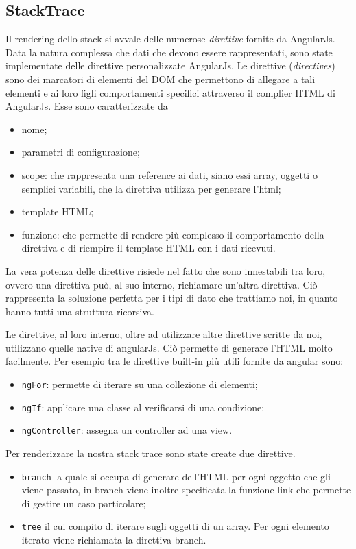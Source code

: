 \subsection{StackTrace} 
Il rendering dello stack si avvale delle numerose \emph{direttive} fornite da 
AngularJs. \\Data la natura complessa che dati che devono essere rappresentati, sono state 
implementate delle direttive personalizzate AngularJs. 
Le direttive (\emph{directives}) sono dei marcatori di elementi del DOM che permettono di allegare 
a tali elementi e ai loro figli comportamenti specifici attraverso il complier 
HTML di AngularJs. Esse sono  caratterizzate da 
\begin{itemize} 
	\item nome;
	\item parametri di configurazione;
	\item scope:  che rappresenta una reference ai dati, siano essi array, oggetti o 
	semplici variabili, che la direttiva utilizza per generare l'html;
	\item template HTML;
	\item funzione: che permette di rendere più complesso il comportamento della direttiva
	e di riempire il template HTML con i dati ricevuti.
\end{itemize} 

La vera potenza delle direttive risiede nel fatto che sono innestabili tra loro, 
ovvero una direttiva può, al suo interno, richiamare un'altra direttiva. Ciò 
rappresenta la soluzione perfetta per i tipi di dato che trattiamo noi, in quanto 
hanno tutti una struttura ricorsiva. 

Le direttive, al loro interno, oltre ad utilizzare altre direttive scritte da noi, 
utilizzano quelle native di angularJs. Ciò permette di generare l'HTML molto 
facilmente. Per esempio tra le direttive built-in più utili fornite da angular sono: 
\begin{itemize} 
	\item \texttt{ngFor}: permette di iterare su una collezione di elementi;
	\item \texttt{ngIf}: applicare una classe  al verificarsi di una condizione; 
	\item \texttt{ngController}: assegna un controller ad una view.
\end{itemize} 

Per renderizzare la nostra stack trace sono state create due direttive. 
\begin{itemize} 
	\item \texttt{branch} la quale si occupa di generare dell'HTML per ogni oggetto che gli viene passato, 
	in branch viene inoltre specificata la funzione link che permette di gestire un caso particolare;
	\item \texttt{tree} il cui compito di iterare sugli oggetti di un array. Per ogni elemento iterato viene richiamata 
	la direttiva branch. 
\end{itemize} 

